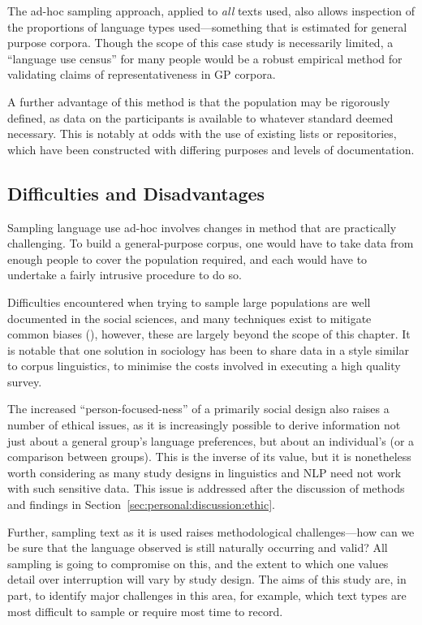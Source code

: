 The ad-hoc sampling approach, applied to \textsl{all} texts used, also allows inspection of the proportions of language types used---something that is estimated for general purpose corpora.  Though the scope of this case study is necessarily limited, a ``language use census'' for many people would be a robust empirical method for validating claims of representativeness in GP corpora.


A further advantage of this method is that the population may be rigorously defined, as data on the participants is available to whatever standard deemed necessary.  This is notably at odds with the use of existing lists or repositories, which have been constructed with differing purposes and levels of documentation.






\subsection{Difficulties and Disadvantages}
Sampling language use ad-hoc involves changes in method that are practically challenging.  To build a general-purpose corpus, one would have to take data from enough people to cover the population required, and each would have to undertake a fairly intrusive procedure to do so.

Difficulties encountered when trying to sample large populations are well documented in the social sciences, and many techniques exist to mitigate common biases (), however, these are largely beyond the scope of this chapter.  It is notable that one solution in sociology has been to share data in a style similar to corpus linguistics, to minimise the costs involved in executing a high quality survey.

The increased ``person-focused-ness'' of a primarily social design also raises a number of ethical issues, as it is increasingly possible to derive information not just about a general group's language preferences, but about an individual's (or a comparison between groups).  This is the inverse of its value, but it is nonetheless worth considering as many study designs in linguistics and NLP need not work with such sensitive data.  This issue is addressed after the discussion of methods and findings in Section~\ref{sec:personal:discussion:ethic}.

Further, sampling text as it is used raises methodological challenges---how can we be sure that the language observed is still naturally occurring and valid?  All sampling is going to compromise on this, and the extent to which one values detail over interruption will vary by study design.  The aims of this study are, in part, to identify major challenges in this area, for example, which text types are most difficult to sample or require most time to record.


